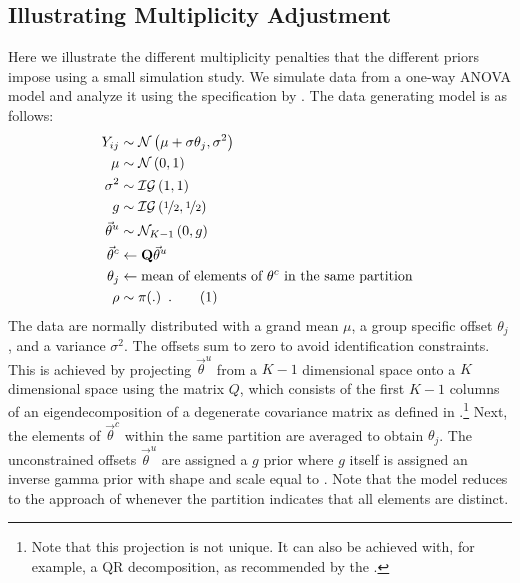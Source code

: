 \documentclass[11pt,a4paper]{article}
\theoremstyle{definition} %
\theoremstyle{case}
\newcommand{\numberthis}{\addtocounter{equation}{1}\tag{\theequation}}
\begin{document}
\subsection{Illustrating Multiplicity Adjustment} \label{sec:illustration}
Here we illustrate the different multiplicity penalties that the different priors impose using a small simulation study. We simulate data from a one-way ANOVA model and analyze it using the specification by \textcite{rouder2012default}. The data generating model is as follows:
\begin{align*}
    Y_{ij}              &\sim \mathcal{N}\left(\mu + \sigma\theta_j, \sigma^2\right)\\
    \mu                 &\sim \mathcal{N}\left(0, 1\right)  \\
    \sigma^2            &\sim \mathcal{IG}\left(1, 1\right) \\
    g                   &\sim \mathcal{IG}\left(\nicefrac{1}{2}, \nicefrac{1}{2}\right) \\
    \vec{\theta}^u   &\sim \mathcal{N}_{K-1}\left(0, g\right)   \\
    \vec{\theta}^c   &\leftarrow \mathbf{Q}\vec{\theta}^u \\
    \theta_j            &\leftarrow \text{mean of elements of } \theta^c \text{ in the same partition }\\
    \rho                &\sim \pi(.) \enspace . \numberthis
\end{align*}
The data are normally distributed with a grand mean $\mu$, a group specific offset $\theta_j$, and a variance $\sigma^2$. The offsets sum to zero to avoid identification constraints. This is achieved by projecting $\vec{\theta}^u$ from a $K-1$ dimensional space onto a $K$ dimensional space using the matrix $Q$, which consists of the first $K-1$ columns of an eigendecomposition of a degenerate covariance matrix as defined in \textcite{rouder2012default}.\footnote{Note that this projection is not unique. It can also be achieved with, for example, a QR decomposition, as recommended by the \textcite{stanUserManual}.} Next, the elements of $\vec{\theta}^c$ within the same partition are averaged to obtain $\theta_j$. The unconstrained offsets $\vec{\theta}^u$ are assigned a $g$ prior where $g$ itself is assigned an inverse gamma prior with shape and scale equal to  \parencite{liang2008mixtures}. Note that the model reduces to the approach of \textcite{rouder2012default} whenever the partition indicates that all elements are distinct.
\end{document}
